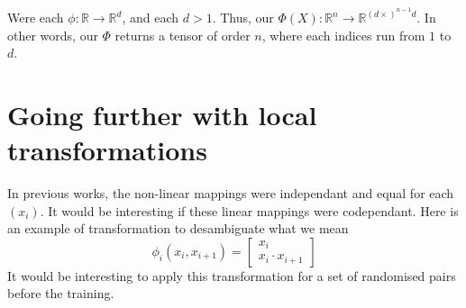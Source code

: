 \documentclass[11pt]{article}
\begin{document}
Were each $\phi : \mathbb{R} \rightarrow \mathbb{R}^d$, and each $d > 1$. Thus, our $\Phi(X) : \mathbb{R}^n \rightarrow \mathbb{R}^{ (d \times)^{n-1}d} $. In other words, our $\Phi$ returns a tensor of order $n$, where each indices run from $1$ to $d$.

\section{Going further with local transformations}
In previous works, the non-linear mappings were independant and equal for each $(x_i)$. It would be interesting if these linear mappings were codependant. Here is an example of transformation to desambiguate what we mean
\begin{equation*}
    \phi_i(x_{i}, x_{i+1}) = \begin{bmatrix}
                                x_{i} \\
                                x_{i} \cdot x_{i+1}
                            \end{bmatrix}
\end{equation*}
It would be interesting to apply this transformation for a set of randomised pairs before the training.



\end{document}
